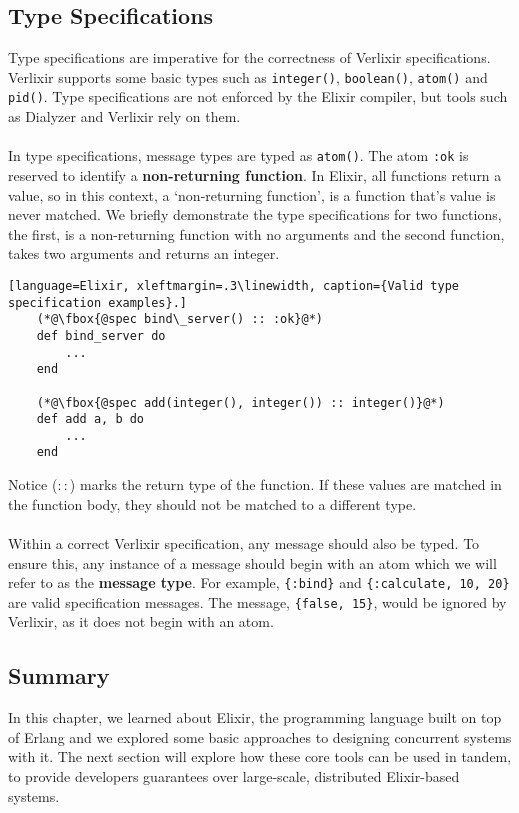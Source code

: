 \subsection{Type Specifications}
Type specifications are imperative for the correctness of Verlixir specifications. Verlixir supports some basic types such as \texttt{integer()}, \texttt{boolean()}, \texttt{atom()} and \texttt{pid()}. Type specifications are not enforced by the Elixir compiler, but tools such as Dialyzer and Verlixir rely on them.
\\ \\
In type specifications, message types are typed as \texttt{atom()}. The atom \texttt{:ok} is reserved to identify a \textbf{non-returning function}. In Elixir, all functions return a value, so in this context, a `non-returning function', is a function that's value is never matched. We briefly demonstrate the type specifications for two functions, the first, is a non-returning function with no arguments and the second function, takes two arguments and returns an integer.
\begin{lstlisting}[language=Elixir, xleftmargin=.3\linewidth, caption={Valid type specification examples}.]
    (*@\fbox{@spec bind\_server() :: :ok}@*)
    def bind_server do
        ...
    end

    (*@\fbox{@spec add(integer(), integer()) :: integer()}@*)
    def add a, b do
        ...
    end
\end{lstlisting}
Notice ($::$) marks the return type of the function. If these values are matched in the function body, they should not be matched to a different type.
\\ \\
Within a correct Verlixir specification, any message should also be typed. To ensure this, any instance of a message should begin with an atom which we will refer to as the \textbf{message type}. For example, \texttt{\{:bind\}} and \texttt{\{:calculate, 10, 20\}} are valid specification messages. The message, \texttt{\{false, 15\}}, would be ignored by Verlixir, as it does not begin with an atom. 
\subsection{Summary}
In this chapter, we learned about Elixir, the programming language built on top of Erlang and we explored some basic approaches to designing concurrent systems with it. The next section will explore how these core tools can be used in tandem, to provide developers guarantees over large-scale, distributed Elixir-based systems.